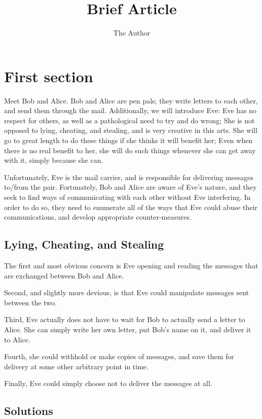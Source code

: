 \documentclass[11pt]{article} %
\title{Brief Article}
\author{The Author}
\begin{document}
\maketitle

\section{First section}

Meet Bob and Alice. Bob and Alice are pen pals; they write letters to each other, and send them through the mail. Additionally, we will introduce Eve:  Eve has no respect for others, as well as a pathological need to try and do wrong; She is not opposed to lying, cheating, and stealing, and is very creative in this arts. She will go to great length to do these things if she thinks it will benefit her; Even when there is no real benefit to her, she will do such things whenever she can get away with it, simply because she can.

Unfortunately, Eve is the mail carrier, and is responsible for delivering messages to/from the pair. Fortunately, Bob and Alice are aware of Eve's nature, and they seek to find ways of communicating with each other without Eve interfering. In order to do so, they need to enumerate all of the ways that Eve could abuse their communications, and develop appropriate counter-measures. 

\subsection{Lying, Cheating, and Stealing}

The first and most obvious concern is Eve opening and reading the messages that are exchanged between Bob and Alice.

Second, and slightly more devious, is that Eve could manipulate messages sent between the two.

Third, Eve actually does not have to wait for Bob to actually send a letter to Alice. She can simply write her own letter, put Bob's name on it, and deliver it to Alice.

Fourth, she could withhold or make copies of messages, and save them for delivery at some other arbitrary point in time.

Finally, Eve could simply choose not to deliver the messages at all.

\subsection{Solutions}
\end{document}
